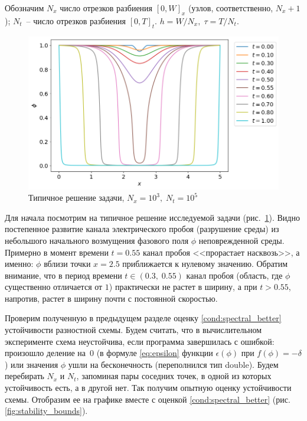Обозначим $N_x$ число отрезков разбиения $[0, W]_x$ (узлов, соответственно, $N_x + 1$); $N_t$~-- число отрезков разбиения $[0, T]_t$. $h = W / N_x, \; \tau = T / N_t$.

\begin{figure}[!t]
	\centering
	\includegraphics[width=\textwidth]{figures/typical_solution.png}
	\vspace{-0.8cm}
	\caption{Типичное решение задачи, $N_x = 10^3, \; N_t = 10^5$}
	\label{fig:typical_solution}
\end{figure}

Для начала посмотрим на типичное решение исследуемой задачи (рис.~\ref{fig:typical_solution}). Видно постепенное развитие канала электрического пробоя (разрушение среды) из небольшого начального возмущения фазового поля $\phi$ неповрежденной среды. Примерно в момент времени $t = 0.55$ канал пробоя <<прорастает насквозь>>, а именно: $\phi$ вблизи точки $x = 2.5$ приближается к нулевому значению. Обратим внимание, что в период времени $t \in (0.3, \; 0.55)$ канал пробоя (область, где $\phi$ существенно отличается от $1$) практически не растет в ширину, а при $t > 0.55$, напротив, растет в ширину почти с постоянной скоростью.

Проверим полученную в предыдущем разделе оценку \eqref{cond:spectral_better} устойчивости разностной схемы. Будем считать, что в вычислительном эксперименте схема неустойчива, если программа завершилась с ошибкой: произошло деление на~$0$ (в формуле \eqref{eq:epsilon} функции $\epsilon(\phi)$ при $f(\phi) = -\delta$) или значения $\phi$ ушли на бесконечность (переполнился тип double). Будем перебирать $N_x$ и $N_t$, запоминая пары соседних точек, в одной из которых устойчивость есть, а в другой нет. Так получим опытную оценку устойчивости схемы. Отобразим ее на графике вместе с оценкой \eqref{cond:spectral_better} (рис. \ref{fig:stability_bounds}).

